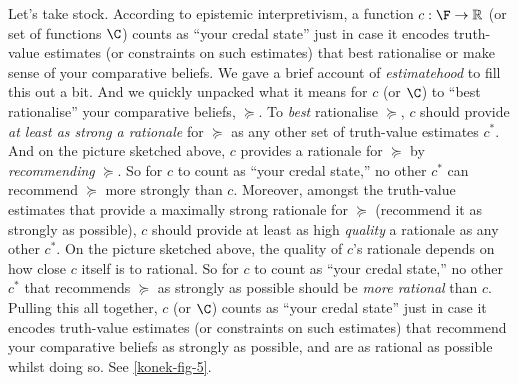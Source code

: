 Let's take stock. According to epistemic interpretivism, a function $c:\F\rightarrow\mathbb{R}$ (or set of functions $\C$) counts as ``your credal state'' just in case it encodes truth-value estimates (or constraints on such estimates) that best rationalise or make sense of your comparative beliefs. We gave a brief account of \textit{estimatehood} to fill this out a bit. And we quickly unpacked what it means for $c$ (or $\C$) to ``best rationalise'' your comparative beliefs, $\succeq$. To \textit{best} rationalise $\succeq$, $c$ should provide \textit{at least as strong a rationale} for $\succeq$ as any other set of truth-value estimates $c^*$. And on the picture sketched above, $c$ provides a rationale for $\succeq$ by \textit{recommending} $\succeq$. So for $c$ to count as ``your credal state,'' no other $c^*$ can recommend $\succeq$ more strongly than $c$. Moreover, amongst the truth-value estimates that provide a maximally strong rationale for $\succeq$ (recommend it as strongly as possible), $c$ should provide at least as high \textit{quality} a rationale as any other $c^*$. On the picture sketched above, the quality of $c$'s rationale depends on how close $c$ itself is to rational. So for $c$ to count as ``your credal state,'' no other $c^*$ that recommends $\succeq$ as strongly as possible should be \textit{more rational} than $c$. Pulling this all together, $c$ (or $\C$) counts as ``your credal state'' just in case it encodes truth-value estimates (or constraints on such estimates) that recommend your comparative beliefs as strongly as possible, and are as rational as possible whilst doing so. See \autoref{konek-fig-5}.

